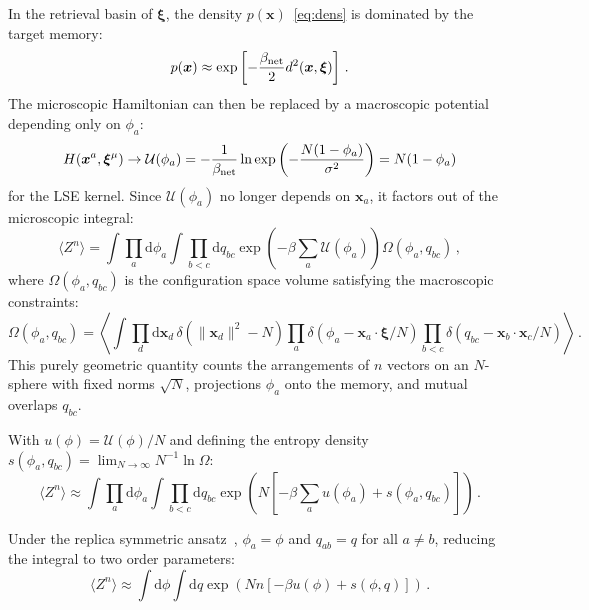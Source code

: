 \documentclass{article}
\newcommand{\dd}{{\mathrm{d}}}
\theoremstyle{plain}
\theoremstyle{definition}
\theoremstyle{remark}
\begin{document}
In the retrieval basin of $\bm{\xi}$, the density $p(\bm{x})$~\eqref{eq:dens} is dominated by the target memory:
\begin{equation}
    p(\bm{x}) \approx \exp\left[ - \frac{\beta_{\rm net}}{2} d^2(\bm{x}, \bm{\xi}) \right] \,.
    \label{eq:dens_red}    
\end{equation}
The microscopic Hamiltonian can then be replaced by a macroscopic potential depending only on $\phi_a$:
\begin{equation}
    H(\bm{x}^a, \bm{\xi}^\mu) \to \mathcal{U}(\phi_a) = -\frac{1}{\beta_{\rm net}} \ln \exp\left( -\frac{N(1 - \phi_a)}{\sigma^2} \right) = N(1-\phi_a)
\end{equation}
for the LSE kernel. Since $\mathcal{U}(\phi_a)$ no longer depends on $\bm{x}_a$, it factors out of the microscopic integral:
\begin{equation}
    \langle Z^n \rangle = \int \prod_a \dd \phi_a \int \prod_{b<c} \dd q_{bc} \exp\left(-\beta \sum_a \mathcal{U}(\phi_a)\right) \Omega(\phi_a, q_{bc})\,,
\end{equation}
where $\Omega(\phi_a, q_{bc})$ is the configuration space volume satisfying the macroscopic constraints:
\begin{equation}
\Omega(\phi_a, q_{bc}) = \left\langle \int \prod_d \dd \bm{x}_d \,\delta(\|\bm{x}_d\|^2 - N) \prod_a \delta(\phi_a - \bm{x}_a \cdot \bm{\xi}/N) \prod_{b<c} \delta(q_{bc} - \bm{x}_b \cdot \bm{x}_c/N) \right\rangle\,.
\end{equation}
This purely geometric quantity counts the arrangements of $n$ vectors on an $N$-sphere with fixed norms $\sqrt{N}$, projections $\phi_a$ onto the memory, and mutual overlaps $q_{bc}$.

With $u(\phi) = \mathcal{U}(\phi)/N$ and defining the entropy density $s(\phi_a, q_{bc}) = \lim_{N \to \infty} N^{-1} \ln \Omega$:
\begin{equation}
    \langle Z^n \rangle \approx \int \prod_a \dd \phi_a \int \prod_{b<c} \dd q_{bc} \exp\left( N \left[ -\beta \sum_a u(\phi_a) + s(\phi_a, q_{bc}) \right] \right)\,.
\end{equation}

Under the replica symmetric ansatz~\citep{amit1987statistical}, $\phi_a = \phi$ and $q_{ab} = q$ for all $a \neq b$, reducing the integral to two order parameters:
\begin{equation}
\langle Z^n \rangle \approx \int \dd \phi \int \dd q \exp \left( N n \left[ -\beta u(\phi) + s(\phi, q) \right] \right)\,.
\end{equation}
\end{document}
